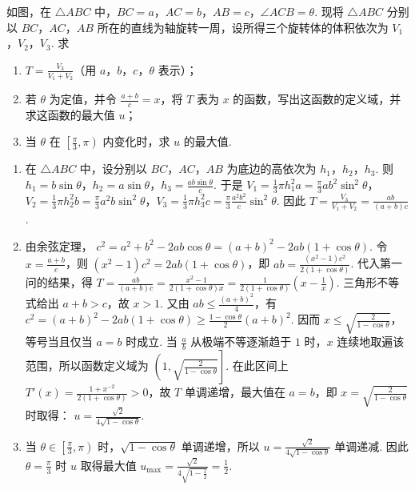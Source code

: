 \begin{problem}
如图，在 \(\triangle ABC\) 中，\(BC = a\)，\(AC = b\)，\(AB = c\)，\(\angle ACB = \theta\). 现将 \(\triangle ABC\) 分别以 \(BC\)，\(AC\)，\(AB\) 所在的直线为轴旋转一周，设所得三个旋转体的体积依次为 \(V_1\)，\(V_2\)，\(V_3\). 求

\begin{enumerate}
\item \(T = \frac{V_3}{V_1 + V_2}\)（用 \(a\)，\(b\)，\(c\)，\(\theta\) 表示）；
\item 若 \(\theta\) 为定值，并令 \(\frac{a + b}{c} = x\)，将 \(T\) 表为 \(x\) 的函数，写出这函数的定义域，并求这函数的最大值 \(u\)；
\item 当 \(\theta\) 在 \(\left[\frac{\pi}{3},\pi\right)\) 内变化时，求 \(u\) 的最大值.
\end{enumerate}

\end{problem}

\begin{solution}
\begin{enumerate}
\item 在 \(\triangle ABC\) 中，设分别以 \(BC\)，\(AC\)，\(AB\) 为底边的高依次为 \(h_1\)，\(h_2\)，\(h_3\). 则 \(h_1 = b\sin \theta\)，\(h_2 = a\sin \theta\)，\(h_3 = \frac{ab\sin \theta}{c}\). 于是 \(V_1 = \frac{1}{3}\pi h_1^2 a = \frac{\pi}{3}ab^2\sin^2 \theta\)，\(V_2 = \frac{1}{3}\pi h_2^2 b = \frac{\pi}{3}a^2b\sin^2 \theta\)，\(V_3 = \frac{1}{3}\pi h_3^2 c = \frac{\pi}{3}\frac{a^2b^2}{c}\sin^2 \theta\). 因此 \(T = \frac{V_3}{V_1 + V_2} = \frac{ab}{(a + b)c}\).
\item 由余弦定理，
\(c^2=a^2+b^2-2ab\cos\theta=(a+b)^2-2ab(1+\cos\theta)\). 令 \(x=\frac{a+b}{c}\)，则
\((x^2-1)c^2=2ab(1+\cos\theta)\)，即 \(ab=\frac{(x^2-1)c^2}{2(1+\cos\theta)}\). 代入第一问的结果，得
\(T=\frac{ab}{(a+b)c}=\frac{x^2-1}{2(1+\cos\theta)x}=\frac{1}{2(1+\cos\theta)}\left(x-\frac1x\right)\).
三角形不等式给出 \(a+b>c\)，故 \(x>1\). 又由 \(ab\leqslant\frac{(a+b)^2}{4}\)，有
\(c^2=(a+b)^2-2ab(1+\cos\theta)\geqslant\frac{1-\cos\theta}{2}(a+b)^2\). 因而 \(x\leqslant\sqrt{\frac{2}{1-\cos\theta}}\)，等号当且仅当 \(a=b\) 时成立. 当 \(\frac{a}{b}\) 从极端不等逐渐趋于 \(1\) 时，\(x\) 连续地取遍该范围，所以函数定义域为
\(\left(1,\sqrt{\frac{2}{1-\cos\theta}}\right]\). 在此区间上
\(T'(x)=\frac{1+x^{-2}}{2(1+\cos\theta)}>0\)，故 \(T\) 单调递增，最大值在 \(a=b\)，即 \(x=\sqrt{\frac{2}{1-\cos\theta}}\) 时取得：
\(u=\frac{\sqrt2}{4\sqrt{1-\cos\theta}}\).
\item 当 \(\theta\in\left[\frac{\pi}{3},\pi\right)\) 时，\(\sqrt{1-\cos\theta}\) 单调递增，所以 \(u=\frac{\sqrt2}{4\sqrt{1-\cos\theta}}\) 单调递减. 因此 \(\theta=\frac{\pi}{3}\) 时 \(u\) 取得最大值
\(u_{\max}=\frac{\sqrt2}{4\sqrt{1-\frac12}}=\frac12\).
\end{enumerate}
\end{solution}
